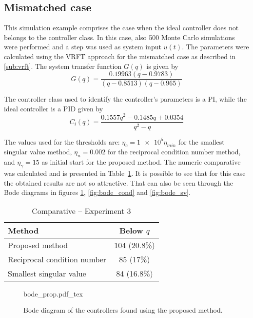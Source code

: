 %
%

\subsection{Mismatched case}
This simulation example comprises the case when the ideal controller does not belongs to the controller class.
In this case, also 500 Monte Carlo simulations were performed and a step was used as system input $u(t)$.
The parameters were calculated using the VRFT approach for the mismatched case as described in \autoref{sub:vrft}.
The system transfer function $G(q)$ is given by
\[
	G(q) = \frac{0.19963 (q-0.9783)}{(q-0.8513) (q-0.965)}
\]

The controller class used to identify the controller's parameters is a PI, while the ideal controller is a PID given by
\[
	C_i(q) = \frac{0.1557 q^2 - 0.1485 q + 0.0354}{q^2 - q}
\]

The values used for the thresholds are: $\eta_c = \num{1e5}\eta_{min} $ for the smallest singular value method, $\eta_n = 0.002$ for the reciprocal condition number method, and $\eta_\gamma = 15$ as initial start for the proposed method.
The numeric comparative was calculated and is presented in Table~\ref{tab:comp_ol_mismatched}.
It is possible to see that for this case the obtained results are not so attractive.
That can also be seen through the Bode diagrams in figures \ref{fig:bode_prop}, \ref{fig:bode_cond} and \ref{fig:bode_sv}.
\begin{table}[h!]
\caption{Comparative -- Experiment 3 \label{tab:comp_ol_mismatched}}
\centering
\begin{tabular}{lc}
\toprule
Method & Below $q$\\
\midrule
Proposed method & 104 (20.8\%) \\
Reciprocal condition number & 85 (17\%) \\
Smallest singular value & 84 (16.8\%) \\
\bottomrule
\end{tabular}
\end{table}

\begin{figure}[h!]
  \centering
  \def\svgwidth{\columnwidth}
  {\footnotesize{bode_prop.pdf_tex}}
  \caption{\label{fig:bode_prop} Bode diagram of the controllers found using the proposed method.}
\end{figure}

